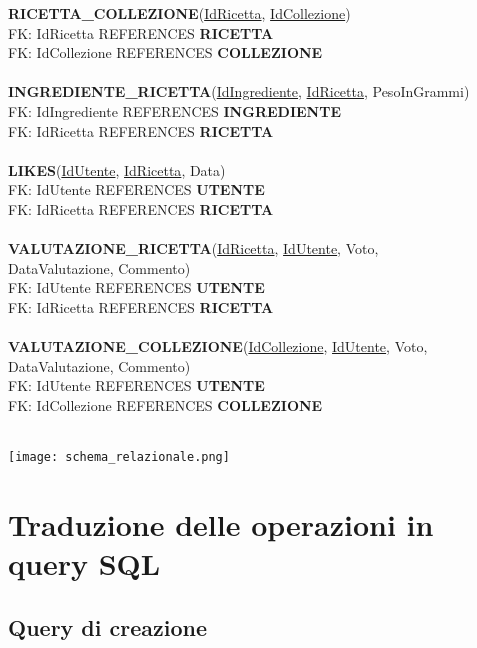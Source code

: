 ﻿\documentclass[a4paper,12pt]{report}
\begin{document}
\textbf{RICETTA\_COLLEZIONE}(\underline{IdRicetta}, \underline{IdCollezione})\\
FK: IdRicetta REFERENCES \textbf{RICETTA}\\
FK: IdCollezione REFERENCES \textbf{COLLEZIONE}\\\\
\textbf{INGREDIENTE\_RICETTA}(\underline{IdIngrediente}, \underline{IdRicetta}, PesoInGrammi)\\
FK: IdIngrediente REFERENCES \textbf{INGREDIENTE}\\
FK: IdRicetta REFERENCES \textbf{RICETTA}\\\\
\textbf{LIKES}(\underline{IdUtente}, \underline{IdRicetta}, Data)\\
FK: IdUtente REFERENCES \textbf{UTENTE}\\
FK: IdRicetta REFERENCES \textbf{RICETTA}\\\\
\textbf{VALUTAZIONE\_RICETTA}(\underline{IdRicetta}, \underline{IdUtente}, Voto,\\ DataValutazione, Commento)\\
FK: IdUtente REFERENCES \textbf{UTENTE}\\
FK: IdRicetta REFERENCES \textbf{RICETTA}\\\\
\textbf{VALUTAZIONE\_COLLEZIONE}(\underline{IdCollezione}, \underline{IdUtente}, Voto,\\ DataValutazione, Commento)\\
FK: IdUtente REFERENCES \textbf{UTENTE}\\
FK: IdCollezione REFERENCES \textbf{COLLEZIONE}\\\\
\begin{sidewaysfigure}[h!]
    \centering
    \texttt{[image: schema\_relazionale.png]}
\end{sidewaysfigure}

\section{Traduzione delle operazioni in query SQL}
\subsection{Query di creazione}
\end{document}
